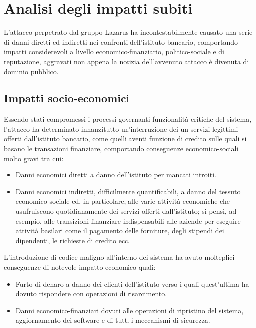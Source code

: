 \documentclass[10pt,a4paper, titlepage]{report}
\begin{document}
\newpage









\newpage
\chapter{Analisi degli impatti subiti}

L'attacco perpetrato dal gruppo Lazarus ha incontestabilmente causato una serie di danni diretti ed indiretti nei confronti dell'istituto bancario, comportando impatti considerevoli a livello economico-finanziario, politico-sociale e di reputazione, aggravati non appena la notizia dell'avvenuto attacco è divenuta di dominio pubblico.

\section{Impatti socio-economici}

Essendo stati compromessi i processi governanti funzionalità critiche del sistema, l'attacco ha determinato innanzitutto un'interruzione dei un servizi legittimi offerti dall'istituto bancario, come quelli aventi funzione di credito sulle quali si basano le transazioni finanziare, comportando conseguenze economico-sociali molto gravi tra cui:
\begin{itemize}
\item Danni economici diretti a danno dell'istituto per mancati introiti.
\item Danni economici indiretti, difficilmente quantificabili, a danno del tessuto economico sociale ed, in particolare, alle varie attività economiche che usufruiscono quotidianamente dei servizi offerti dall'istituto; si pensi, ad esempio, alle transizioni finanziare indispensabili  alle aziende per eseguire attività basilari come il pagamento delle forniture, degli stipendi dei dipendenti, le richieste di credito ecc. 
\end{itemize}

L'introduzione di codice maligno all'interno dei sistema ha avuto molteplici conseguenze di notevole impatto economico quali:
\begin{itemize}
\item Furto di denaro a danno dei clienti dell'istituto verso i quali quest'ultima ha dovuto rispondere con operazioni di risarcimento. 
\item Danni economico-finanziari dovuti alle operazioni di ripristino del sistema, aggiornamento dei software e di tutti i meccanismi di sicurezza.
\end{itemize}
\end{document}

